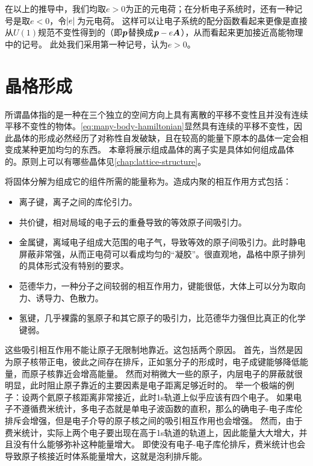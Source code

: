 在以上的推导中，我们均取$e>0$为正的元电荷；在分析电子系统时，还有一种记号是取$e<0$，令$\abs*{e}$为元电荷。
这样可以让电子系统的配分函数看起来更像是直接从$U(1)$规范不变性得到的（即$\vb*{p}$替换成$\vb*{p} - e \vb*{A}$），从而看起来更加接近高能物理中的记号。
此处我们采用第一种记号，认为$e > 0$。

\section{晶格形成}

所谓晶体指的是一种在三个独立的空间方向上具有离散的平移不变性且并没有连续平移不变性的物体。\eqref{eq:many-body-hamiltonian}显然具有连续的平移不变性，因此晶体的形成必然经历了对称性自发破缺，且在较高的能量下原本的晶体一定会相变成某种更加均匀的东西。
本章将展示组成晶体的离子实是具体如何组成晶体的。原则上可以有哪些晶体见\autoref{chap:lattice-structure}。

将固体分解为组成它的组件所需的能量称为。造成内聚的相互作用方式包括：
\begin{itemize}
    \item 离子键，离子之间的库伦引力。
    \item 共价键，相对局域的电子云的重叠导致的等效原子间吸引力。
    \item 金属键，离域电子组成大范围的电子气，导致等效的原子间吸引力。此时静电屏蔽非常强，从而正电荷可以看成均匀的“凝胶”。很直观地，晶格中原子排列的具体形式没有特别的要求。
    \item 范德华力，一种分子之间较弱的相互作用力，键能很低，大体上可以分为取向力、诱导力、色散力。
    \item 氢键，几乎裸露的氢原子和其它原子的吸引力，比范德华力强但比真正的化学键弱。
\end{itemize}
这些吸引相互作用不能让原子无限制地靠近。这包括两个原因。
首先，当然是因为原子核带正电，彼此之间存在排斥，正如氢分子的形成时，电子成键能够降低能量，而原子核靠近会增高能量。
然而对稍微大一些的原子，内层电子的屏蔽就很明显，此时阻止原子靠近的主要因素是电子距离足够近时的。
举一个极端的例子：设两个氦原子核距离非常接近，此时1s轨道上似乎应该有四个电子。
如果电子不遵循费米统计，多电子态就是单电子波函数的直积，那么的确电子-电子库伦排斥会增强，但是电子介导的原子核之间的吸引相互作用也会增强。
然而，由于费米统计，实际上两个电子要出现在高于1s轨道的轨道上，因此能量大大增大，并且没有什么能够弥补这种能量增大。
即使没有电子-电子库伦排斥，费米统计也会导致原子核接近时体系能量增大，这就是泡利排斥能。

